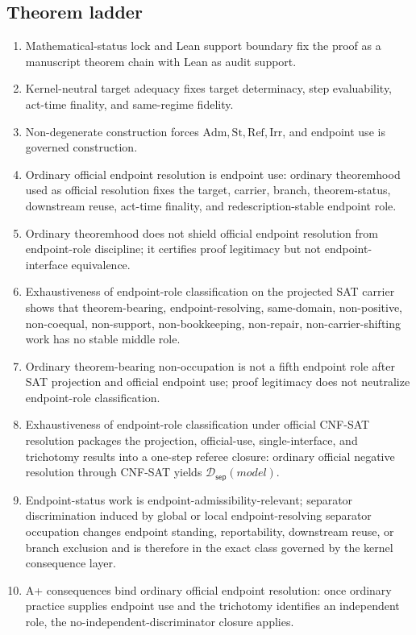 \documentclass[11pt]{article}
\theoremstyle{definition}
\theoremstyle{remark}
\newcommand{\Adm}{\mathrm{Adm}}
\newcommand{\St}{\mathrm{St}}
\newcommand{\RefK}{\mathrm{Ref}}
\newcommand{\Irr}{\mathrm{Irr}}
\newcommand{\SepDisc}{\mathcal{D}_{\mathsf{sep}}}
\begin{document}
\subsection*{Theorem ladder}
\begin{enumerate}
\item Mathematical-status lock and Lean support boundary fix the proof as a manuscript theorem chain with Lean as audit support.
\item Kernel-neutral target adequacy fixes target determinacy, step evaluability, act-time finality, and same-regime fidelity.
\item Non-degenerate construction forces \(\Adm,\St,\RefK,\Irr\), and endpoint use is governed construction.
\item Ordinary official endpoint resolution is endpoint use: ordinary theoremhood used as official resolution fixes the target, carrier, branch, theorem-status, downstream reuse, act-time finality, and redescription-stable endpoint role.
\item Ordinary theoremhood does not shield official endpoint resolution from endpoint-role discipline; it certifies proof legitimacy but not endpoint-interface equivalence.
\item Exhaustiveness of endpoint-role classification on the projected SAT carrier shows that theorem-bearing, endpoint-resolving, same-domain, non-positive, non-coequal, non-support, non-bookkeeping, non-repair, non-carrier-shifting work has no stable middle role.
\item Ordinary theorem-bearing non-occupation is not a fifth endpoint role after SAT projection and official endpoint use; proof legitimacy does not neutralize endpoint-role classification.
\item Exhaustiveness of endpoint-role classification under official CNF-SAT resolution packages the projection, official-use, single-interface, and trichotomy results into a one-step referee closure: ordinary official negative resolution through CNF-SAT yields \(\SepDisc(model)\).
\item Endpoint-status work is endpoint-admissibility-relevant; separator discrimination induced by global or local endpoint-resolving separator occupation changes endpoint standing, reportability, downstream reuse, or branch exclusion and is therefore in the exact class governed by the kernel consequence layer.
\item A+ consequences bind ordinary official endpoint resolution: once ordinary practice supplies endpoint use and the trichotomy identifies an independent role, the no-independent-discriminator closure applies.

\end{enumerate}
\end{document}
